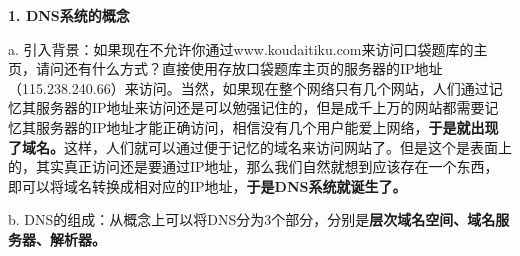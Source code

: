 {\textbf{1. DNS系统的概念}}

a.
引入背景：如果现在不允许你通过www.koudaitiku.com来访问口袋题库的主页，请问还有什么方式？直接使用存放口袋题库主页的服务器的IP地址（115.238.240.66）来访问。当然，如果现在整个网络只有几个网站，人们通过记忆其服务器的IP地址来访问还是可以勉强记住的，但是成千上万的网站都需要记忆其服务器的IP地址才能正确访问，相信没有几个用户能爱上网络，\textbf{于是就出现了域名。}这样，人们就可以通过便于记忆的域名来访问网站了。但是这个是表面上的，其实真正访问还是要通过IP地址，那么我们自然就想到应该存在一个东西，即可以将域名转换成相对应的IP地址，\textbf{于是DNS系统就诞生了。}

b.
DNS的组成：从概念上可以将DNS分为3个部分，分别是\textbf{{层次域名空间、域名服务器、解析器}。}
